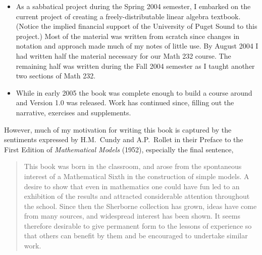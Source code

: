 \begin{itemize}
%
\item As a sabbatical project during the Spring 2004 semester, I embarked on the current project of creating a freely-distributable linear algebra textbook.  (Notice the implied financial support of the University of Puget Sound to this project.)  Most of the material was written from scratch since changes in notation and approach made much of my notes of little use.  By August 2004 I had written half the material necessary for our Math 232 course.  The remaining half was written during the Fall 2004 semester as I taught another two sections of Math 232.  
%
\item While in early 2005 the book was complete enough to build a course around and Version 1.0 was released. Work has continued since, filling out the narrative, exercises and supplements.
%
\end{itemize}
%
However, much of my motivation for writing this book is captured by the sentiments expressed by H.M.\ Cundy and A.P.\ Rollet in their Preface to the First Edition  of 
{\sl Mathematical Models} (1952), especially the final sentence,
%
\begin{quote}
This book was born in the classroom, and arose from the spontaneous interest of a Mathematical Sixth in the construction of simple models.  A desire to show that even in mathematics one could have fun led to an exhibition of the results and attracted considerable attention throughout the school.  Since then the Sherborne collection has grown, ideas have come from many sources, and widespread interest has been shown.  It seems therefore desirable to give permanent form to the lessons of experience so that others can benefit by them and be encouraged to undertake similar work.
\end{quote}
%
